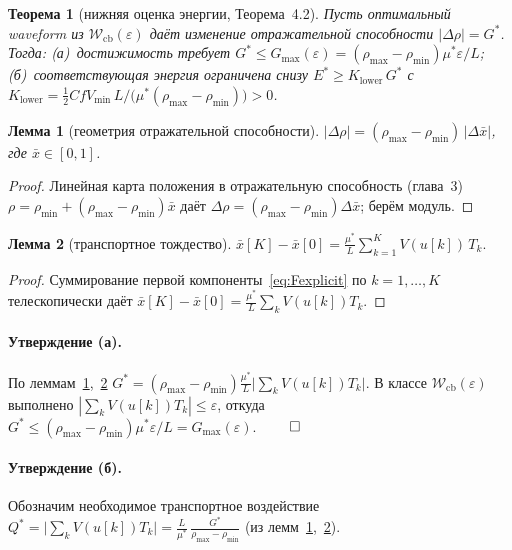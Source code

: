 \documentclass[12pt,a4paper]{article}
\theoremstyle{plain}
\newtheorem{theorem}{Теорема}
\newtheorem{lemma}{Лемма}
\theoremstyle{definition}\newtheorem{remark}{Замечание}
\newcommand{\Wcb}{\mathcal{W}_{\mathrm{cb}}}
\newcommand{\xbar}{\bar{x}}
\begin{document}
\begin{theorem}[нижняя оценка энергии, Теорема~4.2]\label{thm:lb}
Пусть оптимальный waveform из $\Wcb(\varepsilon)$ даёт изменение
отражательной способности $|\Delta\rho|=G^{*}$. Тогда:
\textnormal{(а)}~достижимость требует $G^{*}\le G_{\max}(\varepsilon)
=(\rho_{\max}-\rho_{\min})\mu^{*}\varepsilon/L$;
\textnormal{(б)}~соответствующая энергия ограничена снизу
$E^{*}\ge K_{\mathrm{lower}}\,G^{*}$ с
$K_{\mathrm{lower}}=\tfrac12 C f V_{\min}\,L/\bigl(\mu^{*}(\rho_{\max}-\rho_{\min})\bigr)>0$.
\end{theorem}

\begin{lemma}[геометрия отражательной способности]\label{lem:geom}
$|\Delta\rho|=(\rho_{\max}-\rho_{\min})\,|\Delta\xbar|$, где $\xbar\in[0,1]$.
\end{lemma}
\begin{proof}
Линейная карта положения в отражательную способность (глава~3)
$\rho=\rho_{\min}+(\rho_{\max}-\rho_{\min})\xbar$ даёт
$\Delta\rho=(\rho_{\max}-\rho_{\min})\Delta\xbar$; берём модуль. \end{proof}

\begin{lemma}[транспортное тождество]\label{lem:transport}
$\displaystyle \xbar[K]-\xbar[0]=\frac{\mu^*}{L}\sum_{k=1}^{K}V(u[k])\,T_k.$
\end{lemma}
\begin{proof}
Суммирование первой компоненты~\eqref{eq:Fexplicit} по $k=1,\dots,K$ телескопически
даёт $\xbar[K]-\xbar[0]=\frac{\mu^*}{L}\sum_k V(u[k])T_k$. \end{proof}

\paragraph{Утверждение (а).} По леммам~\ref{lem:geom},~\ref{lem:transport}
$G^{*}=(\rho_{\max}-\rho_{\min})\frac{\mu^*}{L}\bigl|\sum_k V(u[k])T_k\bigr|$.
В классе $\Wcb(\varepsilon)$ выполнено $|\sum_k V(u[k])T_k|\le\varepsilon$, откуда
$G^{*}\le(\rho_{\max}-\rho_{\min})\mu^*\varepsilon/L=G_{\max}(\varepsilon)$. $\qed$

\paragraph{Утверждение (б).} Обозначим необходимое транспортное воздействие
$Q^{*}=\bigl|\sum_k V(u[k])T_k\bigr|=\frac{L}{\mu^*}\,\frac{G^{*}}{\rho_{\max}-\rho_{\min}}$
(из лемм~\ref{lem:geom},~\ref{lem:transport}).
\end{document}
